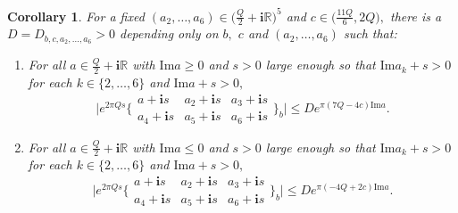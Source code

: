 \documentclass[11pt]{article}
\newtheorem{corollary}[theorem]{Corollary}
\theoremstyle{remark}
\theoremstyle{remark}
\numberwithin{equation}{section}
\begin{document}
\begin{corollary}\label{cor}
For a fixed $(a_2,\dots,a_6)\in\big(\frac{Q}{2}+\mathbf i\mathbb R\big)^5$ and $c\in \big(\frac{11Q}{6},2Q\big),$ there is a $D=D_{b,c,a_2,\dots,a_6}>0$ depending only on $b,$ $c$ and $(a_2,\dots,a_6)$ such that:
\begin{enumerate}[(1)]
    \item For all $a\in \frac{Q}{2}+\mathbf i\mathbb R$ with $\mathrm{Im}a\geqslant 0$ and $s>0$ large enough so that $\mathrm{Im}a_k + s>0$ for each $k\in\{2,\dots, 6\}$ and $\mathrm{Im}a + s>0,$
$$\Bigg|e^{2\pi Q s} \bigg\{\begin{matrix} a+\mathbf is & a_2 +\mathbf is & a_3+\mathbf is  \\ a_4+\mathbf is & a_5+\mathbf is & a_6+\mathbf is \end{matrix} \bigg\}_b\Bigg|\leqslant De^{\pi(7Q-4c)\mathrm{Im}a}.$$

\item For all $a\in \frac{Q}{2}+\mathbf i\mathbb R$ with $\mathrm{Im}a\leqslant 0$ and $s>0$ large enough so that $\mathrm{Im}a_k + s>0$ for each $k\in\{2,\dots, 6\}$ and $\mathrm{Im}a + s>0,$
$$\Bigg|e^{2\pi Q s} \bigg\{\begin{matrix} a+\mathbf is & a_2 +\mathbf is & a_3+\mathbf is  \\ a_4+\mathbf is & a_5+\mathbf is & a_6+\mathbf is \end{matrix} \bigg\}_b\Bigg|\leqslant De^{\pi(-4Q+2c)\mathrm{Im}a}.$$
\end{enumerate}
\end{corollary}
\end{document}
